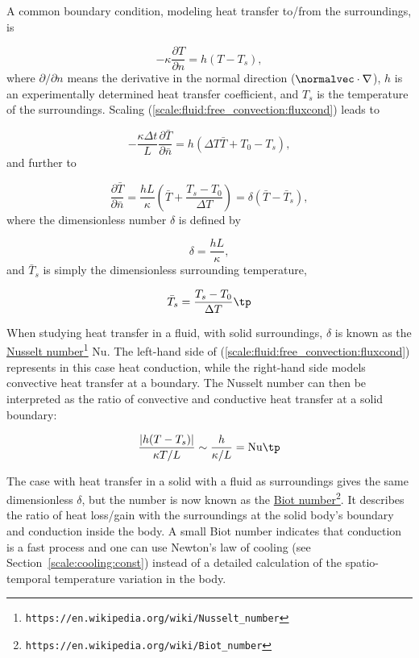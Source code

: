\documentclass[graybox,envcountchap,sectrefs,final]{svmonodo}
\begin{document}
A common boundary condition, modeling heat transfer to/from the
surroundings, is

\begin{equation}
-\kappa\frac{\partial T}{\partial n} = h(T - T_s),
\label{scale:fluid:free_convection:fluxcond}
\end{equation}
where $\partial/\partial n$ means the derivative in the normal direction
($\normalvec\cdot\nabla$), $h$ is an experimentally determined
heat transfer coefficient, and $T_s$ is the temperature of
the surroundings. Scaling (\ref{scale:fluid:free_convection:fluxcond})
leads to

\[ -\frac{\kappa\Delta t}{L}\frac{\partial \bar T}{\partial \bar n} = h(\Delta T \bar T + T_0 - T_s),\]
and further to

\[ \frac{\partial \bar T}{\partial \bar n} =
\frac{hL}{\kappa}(\bar T + \frac{T_s - T_0}{\Delta T})
= \delta(\bar T - \bar T_s),
\]
where the dimensionless number $\delta$ is defined by

\[ \delta = \frac{hL}{\kappa},\]
and $\bar T_s$ is simply the dimensionless surrounding temperature,

\[ \bar T_s = \frac{T_s - T_0}{\Delta T}\tp\]

When studying heat transfer in a fluid, with solid surroundings,
$\delta$ is known as the \href{{https://en.wikipedia.org/wiki/Nusselt_number}}{Nusselt number}\footnote{\texttt{https://en.wikipedia.org/wiki/Nusselt\_number}} Nu.  The left-hand side
of (\ref{scale:fluid:free_convection:fluxcond}) represents in this case
heat conduction, while the right-hand side models convective heat
transfer at a boundary. The Nusselt number can then be interpreted as
the ratio of convective and conductive heat transfer at a solid
boundary:

\[ \frac{|h(T-T_s)|}{\kappa T/L} \sim \frac{h}{\kappa /L} = \hbox{Nu}\tp\]

The case with heat transfer in a solid with a fluid as surroundings
gives the same dimensionless $\delta$, but the number is now known as
the \href{{https://en.wikipedia.org/wiki/Biot_number}}{Biot number}\footnote{\texttt{https://en.wikipedia.org/wiki/Biot\_number}}. It
describes the ratio of heat loss/gain with the surroundings at the
solid body's boundary and conduction inside the body. A small Biot
number indicates that conduction is a fast process and one can use
Newton's law of cooling (see Section~\ref{scale:cooling:const})
instead of a detailed calculation of the
spatio-temporal temperature variation in the body.
\end{document}
